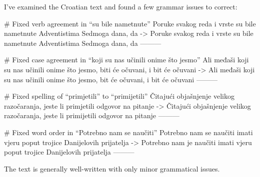 I've examined the Croatian text and found a few grammar issues to correct:

# Fixed verb agreement in “su bile nametnute”
Poruke svakog reda i vrste su bile nametnute Adventistima Sedmoga dana, da
->
Poruke svakog reda i vrste su bile nametnute Adventistima Sedmoga dana, da
---------

# Fixed case agreement in “koji su nas učinili onime što jesmo”
Ali međaši koji su nas učinili onime što jesmo, biti će očuvani, i bit će očuvani
->
Ali međaši koji su nas učinili onime što jesmo, bit će očuvani, i bit će očuvani
---------

# Fixed spelling of “primjetili” to “primijetili”
Čitajući objašnjenje velikog razočaranja, jeste li primjetili odgovor na pitanje
->
Čitajući objašnjenje velikog razočaranja, jeste li primijetili odgovor na pitanje
---------

# Fixed word order in “Potrebno nam se naučiti”
Potrebno nam se naučiti imati vjeru poput trojice Danijelovih prijatelja
->
Potrebno nam je naučiti imati vjeru poput trojice Danijelovih prijatelja
---------

The text is generally well-written with only minor grammatical issues.